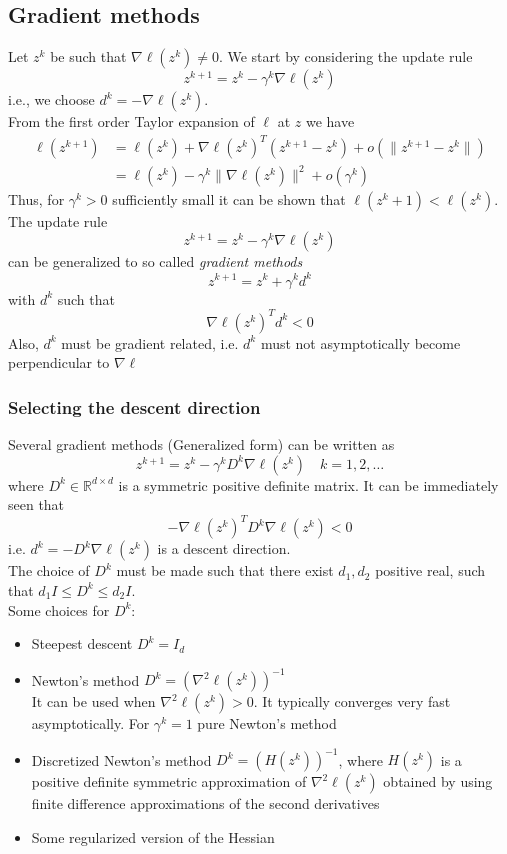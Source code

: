 \documentclass[openany]{book}
\newcommand{\R}{\mathbb{R}}               %
\theoremstyle{definition}
\theoremstyle{remark}
\begin{document}
\subsection{Gradient methods}
Let $z^k$ be such that $\nabla\ell(z^k)\neq 0$. We start by considering the update rule 
\[
    z^{k+1} = z^k-\gamma^k\nabla\ell(z^k)
\]
i.e., we choose $d^k = -\nabla\ell(z^k)$.\\
From the first order Taylor expansion of $\ell$ at $z$ we have 
\begin{align*}
    \ell(z^{k+1}) & =  \ell(z^k)+\nabla\ell(z^k)^T(z^{k+1}-z^k)+o(\|z^{k+1}-z^k\|)\\
    & =  \ell(z^k)-\gamma^k\|\nabla\ell(z^k)\|^2+o(\gamma^k)
\end{align*}
Thus, for $\gamma^k>0$ sufficiently small it can be shown that $\ell(z^k+1)<\ell(z^k)$.\\
The update rule 
\[
    z^{k+1}=z^k-\gamma^k\nabla\ell(z^k)
\]
can be generalized to so called \emph{gradient methods}
\[
    z^{k+1}=z^k+\gamma^kd^k
\]
with $d^k$ such that
\[
    \nabla\ell(z^k)^Td^k<0
\]
Also, $d^k$ must be gradient related, i.e. $d^k$ must not asymptotically become perpendicular to $\nabla\ell$

\subsubsection{Selecting the descent direction}

Several gradient methods (Generalized form) can be written as 
\[
    z^{k+1} = z^k-\gamma^kD^k\nabla\ell(z^k) \quad k=1,2,\dots
\]
where $D^k\in\R^{d\times d}$ is  a symmetric positive definite matrix. It can be immediately seen that 
\[
    -\nabla\ell(z^k)^TD^k\nabla\ell(z^k)<0
\]
i.e. $d^k = -D^k\nabla\ell(z^k)$ is a descent direction.\\
The choice of $D^k$ must be made such that there exist $d_1,d_2$ positive real, such that $d_1 I \leq D^k \leq d_2 I$.\\ [0.5cm]
Some choices for $D^k$:
\begin{itemize}
    \item Steepest descent $D^k=I_d$
    \item Newton's method $D^k = (\nabla^2\ell(z^k))^{-1}$\\
        It can be used when $\nabla^2\ell(z^k)>0$. It typically converges very fast asymptotically. For $\gamma^k = 1$ pure Newton's method
    \item Discretized Newton's method $D^k=(H(z^k))^{-1}$, where $H(z^k)$ is a positive definite symmetric approximation of $\nabla^2\ell(z^k)$ obtained by using finite difference approximations of the second derivatives 
    \item Some regularized version of the Hessian
\end{itemize}
\end{document}
